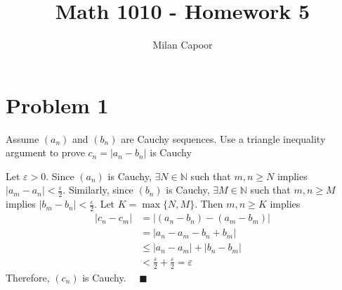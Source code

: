 \documentclass[12pt]{article}
\title{Math 1010 - Homework 5}
\author{Milan Capoor}
\date{}
\newcommand{\N}{\mathbb{N}}
\newcommand{\qed}{\quad \blacksquare}
\newcommand{\abs}[1]{\left\vert #1 \right\vert}
\newcommand{\ep}{\varepsilon}
\begin{document}
\maketitle
\section*{Problem 1}
Assume $(a_n)$ and $(b_n)$ are Cauchy sequences. Use a triangle inequality argument to prove $c_n = \abs{a_n - b_n}$ is Cauchy

    \color{blue}
        Let $\ep > 0$. Since $(a_n)$ is Cauchy, $\exists N \in \N$ such that $m,n \geq N$ implies $\abs{a_m - a_n} < \frac{\ep}{2}$. Similarly, since $(b_n)$ is Cauchy, $\exists M \in \N$ such that $m,n \geq M$ implies $\abs{b_m - b_n} < \frac{\ep}{2}$. Let $K = \max\{N,M\}$. Then $m,n \geq K$ implies
        \begin{align*}
            \abs{c_n - c_m} &= \abs{(a_n - b_n) - (a_m - b_m)}\\ 
                &= \abs{a_n - a_m - b_n + b_m}\\ 
                &\leq \abs{a_n - a_m} + \abs{b_n - b_m}\\ 
                &< \frac{\ep}{2} + \frac{\ep}{2} = \ep
        \end{align*}
        Therefore, $(c_n)$ is Cauchy. $\qed$
    \color{black}

\pagebreak 
\end{document}
